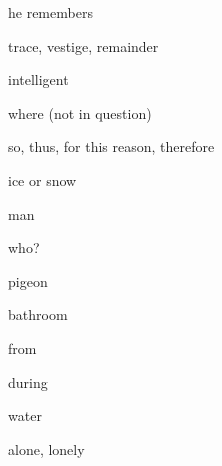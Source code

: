 \documentclass[avery5371,grid,frame]{flashcards}
\begin{document}
\begin{flashcard}{\LARGE he remembers}
\LARGE {}
\end{flashcard}
\begin{flashcard}{\LARGE trace, vestige, remainder}
\LARGE {}
\end{flashcard}
\begin{flashcard}{\LARGE intelligent}
\LARGE {}
\end{flashcard}
\begin{flashcard}{\LARGE where (not in question)}
\LARGE {}
\end{flashcard}
\begin{flashcard}{\LARGE so, thus, for this reason, therefore}
\LARGE {}
\end{flashcard}
\begin{flashcard}{\LARGE ice or snow}
\LARGE {}
\end{flashcard}
\begin{flashcard}{\LARGE man}
\LARGE {}
\end{flashcard}
\begin{flashcard}{\LARGE who?}
\LARGE {}
\end{flashcard}
\begin{flashcard}{\LARGE pigeon}
\LARGE {}
\end{flashcard}
\begin{flashcard}{\LARGE bathroom}
\LARGE {}
\end{flashcard}
\begin{flashcard}{\LARGE from}
\LARGE {}
\end{flashcard}
\begin{flashcard}{\LARGE during}
\LARGE {}
\end{flashcard}
\begin{flashcard}{\LARGE water}
\LARGE {}
\end{flashcard}
\begin{flashcard}{\LARGE alone, lonely}
\LARGE {}
\end{flashcard}
\end{document}
